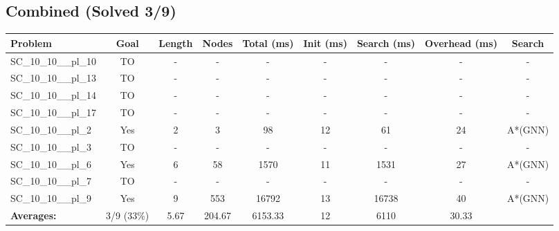 \documentclass{article}
\begin{document}
\subsection*{Combined (Solved 3/9)}
\begin{tabular}{lcccccccc}
\toprule
Problem & Goal & Length & Nodes & Total (ms) & Init (ms) & Search (ms) & Overhead (ms) & Search \\
\midrule
SC\_10\_10\_\_pl\_10 & TO & - & - & - & - & - & - & - \\
SC\_10\_10\_\_pl\_13 & TO & - & - & - & - & - & - & - \\
SC\_10\_10\_\_pl\_14 & TO & - & - & - & - & - & - & - \\
SC\_10\_10\_\_pl\_17 & TO & - & - & - & - & - & - & - \\
SC\_10\_10\_\_pl\_2 & Yes & 2 & 3 & 98 & 12 & 61 & 24 & A*(GNN) \\
SC\_10\_10\_\_pl\_3 & TO & - & - & - & - & - & - & - \\
SC\_10\_10\_\_pl\_6 & Yes & 6 & 58 & 1570 & 11 & 1531 & 27 & A*(GNN) \\
SC\_10\_10\_\_pl\_7 & TO & - & - & - & - & - & - & - \\
SC\_10\_10\_\_pl\_9 & Yes & 9 & 553 & 16792 & 13 & 16738 & 40 & A*(GNN) \\
\textbf{Averages:} & 3/9 (33\%) & 5.67 & 204.67 & 6153.33 & 12 & 6110 & 30.33 & \\
\bottomrule
\end{tabular}
\\[0.7cm]
\end{document}

